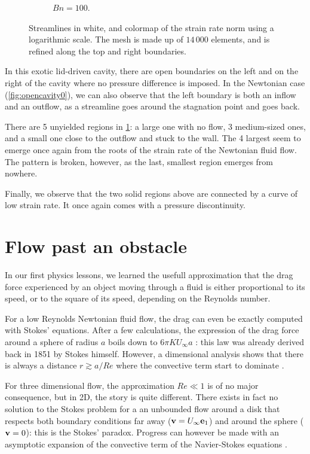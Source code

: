 \documentclass[11 pt]{report}
\begin{document}
\begin{figure}[h]
\begin{subfigure}[t]{0.495\textwidth}
        \caption{$Bn=100$.}
        \label{fig:opencavity100}
    \end{subfigure}
    \caption{Streamlines in white, and colormap of the strain rate norm using a logarithmic scale. The mesh is made up of $14\,000$ elements, and is refined along the top and right boundaries.}
    \label{fig:opencavity}
\end{figure} 

In this exotic lid-driven cavity, there are open boundaries on the left and on the right of the cavity where no pressure difference is imposed. In the Newtonian case (\cref{fig:opencavity0}), we can also observe that the left boundary is both an inflow and an outflow, as a streamline goes around the stagnation point and goes back. 

There are 5 unyielded regions in \cref{fig:opencavity100}: a large one with no flow, 3 medium-sized ones, and a small one close to the outflow and stuck to the wall. The 4 largest seem to emerge once again from the roots of the strain rate of the Newtonian fluid flow. The pattern is broken, however, as the last, smallest region emerges from nowhere.

Finally, we observe that the two solid regions above are connected by a curve of low strain rate. It once again comes with a pressure discontinuity.

\section{Flow past an obstacle}

In our first physics lessons, we learned the usefull approximation that the drag force experienced by an object moving through a fluid is either proportional to its speed, or to the square of its speed, depending on the Reynolds number.

For a low Reynolds Newtonian fluid flow, the drag can even be exactly computed with Stokes' equations. After a few calculations, the expression of the drag force around a sphere of radius $a$ boils down to $6\pi K U_{\infty} a$ \cite{stokesSphere,stokesExpansion}: this law was already derived back in 1851 by Stokes himself. However, a dimensional analysis shows that there is always a distance $r \gtrsim a / Re$ where the convective term start to dominate \cite{lamb1945hydrodynamics,stokesExpansion}. 

For three dimensional flow, the approximation $Re\ll 1$ is of no major consequence, but in 2D, the story is quite different. There exists in fact no solution to the Stokes problem for a an unbounded flow around a disk that respects both boundary conditions far away ($\mathbf{v}=U_{\infty}\mathbf{e}_1$) and around the sphere ($\mathbf{v}=0$): this is the Stokes' paradox. Progress can however be made with an asymptotic expansion of the convective term of the Navier-Stokes equations \cite{stokesExpansion}.
\end{document}
